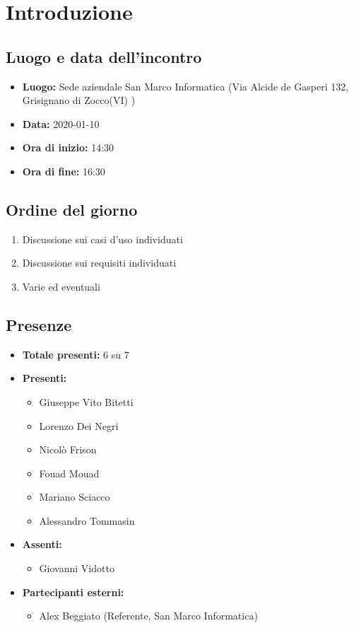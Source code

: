 \section*{Introduzione}

\subsection*{Luogo e data dell'incontro}
	\begin{itemize}
		\item \textbf{Luogo:} Sede aziendale San Marco Informatica (Via Alcide de Gasperi 132, Grisignano di Zocco(VI) )
		\item \textbf{Data:} 2020-01-10
		\item \textbf{Ora di inizio:} 14:30
		\item \textbf{Ora di fine:} 16:30
	\end{itemize}

\subsection*{Ordine del giorno}
	\begin{enumerate}
		\item Discussione sui casi d'uso individuati
		\item Discussione sui requisiti individuati
		\item Varie ed eventuali
	\end{enumerate}

\subsection*{Presenze}
	\begin{itemize}
		\item \textbf{Totale presenti:} 6 su 7
		\item \textbf{Presenti: }
			\begin{itemize}			
				\item Giuseppe Vito Bitetti
				\item Lorenzo Dei Negri
				\item Nicolò Frison
				\item Fouad Mouad
				\item Mariano Sciacco
				\item Alessandro Tommasin
			\end{itemize}
		\item \textbf{Assenti: } 
			\begin{itemize}	
				\item Giovanni Vidotto
			\end{itemize}
		\item \textbf{Partecipanti esterni:}
			\begin{itemize}
				\item Alex Beggiato (Referente, San Marco Informatica)
			\end{itemize}
	\end{itemize}


